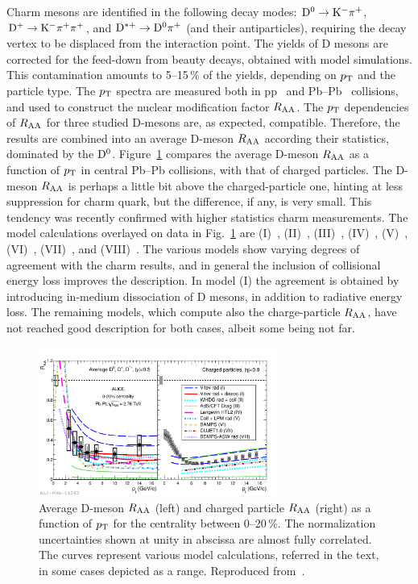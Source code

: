 Charm mesons are identified in the following decay modes: ${\rm D}^0 \rightarrow {\rm K}^-\pi^+$, ${\rm D}^+ \rightarrow {\rm K}^-\pi^+\pi^+$, and ${\rm D}^{*+} \rightarrow {\rm D}^0\pi^+$ (and their antiparticles), requiring the decay vertex to be displaced from the interaction point. The yields of D mesons are corrected for the feed-down from beauty decays, obtained with model simulations. This contamination amounts to 5--15\,\% of the yields, depending on $p_{\rm T}$ and the particle type. The $p_{\rm T}$ spectra are measured both in pp~\cite{ALICE:2011aa,Abelev:2012vra} and Pb--Pb~\cite{ALICE:2012ab} collisions, and used to construct the nuclear modification factor $R_{\rm AA}$. The $p_{\rm T}$ dependencies of $R_{\rm AA}$ for three studied D-mesons are, as expected, compatible. Therefore, the results are combined into an average D-meson $R_{\rm AA}$ according their statistics, dominated by the ${\rm D}^0$. Figure~\ref{figks:DmesonRAA} compares the average D-meson $R_{\rm AA}$ as a function of $p_{\rm T}$ in central Pb--Pb collisions, with that of charged particles. The D-meson $R_{\rm AA}$ is perhaps a little bit above the charged-particle one, hinting at less suppression for charm quark, but the difference, if any, is very small. This tendency was recently confirmed with higher statistics charm measurements. The model calculations overlayed on data in Fig.~\ref{figks:DmesonRAA} are (I)~\cite{Sharma:2009hn,He:2011pd}, (II)~\cite{Horowitz:2011cv}, (III)~\cite{Horowitz:2011wm}, (IV)~\cite{Alberico:2011zy,Monteno:2011gq}, (V)~\cite{Gossiaux:2009mk,Gossiaux:2010yx}, (VI)~\cite{Fochler:2011en}, (VII)~\cite{Buzzatti:2011vt}, and (VIII)~\cite{Armesto:2005iq}. The various models show varying degrees of agreement with the charm results, and in general the inclusion of collisional energy loss improves the description. In model (I) the agreement is obtained by introducing in-medium dissociation of D mesons, in addition to radiative energy loss. The remaining models, which compute also the charge-particle $R_{\rm AA}$, have not reached good description for both cases, albeit some being not far.

\begin{figure}
\centering
\includegraphics[width=0.7\textwidth]{ksfigures/DmesonChargedRAAmodels.pdf}
\caption{Average D-meson $R_{\rm AA}$ (left) and charged particle $R_{\rm AA}$ (right) as a function of $p_{\rm T}$ for the centrality between 0--20\,\%. The normalization uncertainties shown at unity in abscissa are almost fully correlated. The curves represent various model calculations, referred in the text, in some cases depicted as a range. Reproduced from~\cite{ALICE:2012ab}.}
\label{figks:DmesonRAA}
\end{figure}

